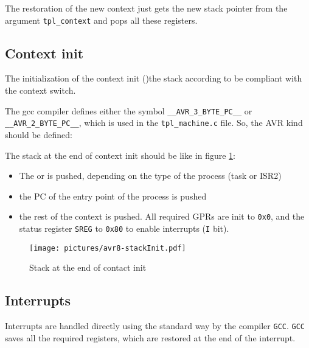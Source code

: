 The restoration of the new context just gets the new stack pointer from the argument \texttt{tpl_context} and pops all these registers.

\subsection{Context init}
The initialization of the context init ()the stack according to be compliant with the context switch. 


The gcc compiler defines either the symbol \texttt{\_\_AVR\_3\_BYTE\_PC\_\_} or \texttt{\_\_AVR\_2\_BYTE\_PC\_\_}, which is used in the \texttt{tpl\_machine.c} file.
So, the AVR kind should be defined:

The stack at the end of context init should be like in figure \ref{fig:avr8-stackInit}:
\begin{itemize}
\item The  or  is pushed, depending on the type of the process (task or ISR2)
\item the PC of the entry point of the process is pushed
\item the rest of the context is pushed. All required GPRs are init to \texttt{0x0}, and the status register \texttt{SREG} to \texttt{0x80} to enable interrupts (\texttt{I} bit).
\end{itemize}
\begin{figure}[htbp] %
\begin{minipage}{0.4\textwidth}
    \centering
  \texttt{[image: pictures/avr8-stackInit.pdf]} 
\end{minipage}
\begin{minipage}{0.6\textwidth}
  \caption{Stack at the end of contact init}\label{fig:avr8-stackInit}
\end{minipage}
\end{figure}

\subsection{Interrupts}
Interrupts are handled directly using the standard way by the compiler \texttt{GCC}. \texttt{GCC} saves all the required registers, which are restored at the end of the interrupt.

